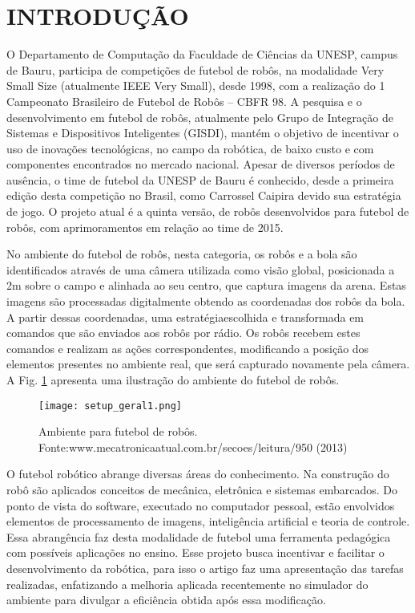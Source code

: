  \section{INTRODU{\c C}ÃO}

O Departamento de Computação da Faculdade de Ciências
da UNESP, campus de Bauru, participa de competições de
futebol de robôs, na modalidade Very Small Size (atualmente
IEEE Very Small), desde 1998, com a realização do 1\textordmasculine
Campeonato Brasileiro de Futebol de Robôs -- CBFR 98. A
pesquisa e o desenvolvimento em futebol de robôs, atualmente
pelo Grupo de Integração de Sistemas e Dispositivos
Inteligentes (GISDI), mantém o objetivo de incentivar o uso de
inovações tecnológicas, no campo da robótica, de baixo custo e
com componentes encontrados no mercado nacional. Apesar
de diversos períodos de ausência, o time de futebol da UNESP
de Bauru é conhecido, desde a primeira edição desta
competição no Brasil, como Carrossel Caipira devido sua
estratégia de jogo. O projeto atual é a quinta versão, de robôs
desenvolvidos para futebol de robôs, com aprimoramentos em
relação ao time de 2015.

No ambiente do futebol de robôs, nesta categoria, os robôs
e a bola são identificados através de uma câmera utilizada
como visão global, posicionada a 2m sobre o campo e alinhada
ao seu centro, que captura imagens da arena. Estas imagens são
processadas digitalmente obtendo as coordenadas dos robôs da bola.
A partir dessas coordenadas, uma estratégiaescolhida e transformada em comandos que são enviados aos
robôs por rádio. Os robôs recebem estes comandos e realizam
as ações correspondentes, modificando a posição dos
elementos presentes no ambiente real, que será capturado
novamente pela câmera. A Fig. \ref{fig:setup_geral} apresenta uma ilustração do
ambiente do futebol de robôs.

\begin{figure}[!htb]
\centering
\texttt{[image: setup\_geral1.png]}
\caption{Ambiente para futebol de robôs. Fonte:www.mecatronicaatual.com.br/secoes/leitura/950 (2013)}
\label{fig:setup_geral}
\end{figure}

O futebol robótico abrange diversas áreas do conhecimento.
Na construção do robô são aplicados conceitos de mecânica,
eletrônica e sistemas embarcados. Do ponto de vista do
software, executado no computador pessoal, estão envolvidos
elementos de processamento de imagens, inteligência artificial
e teoria de controle. Essa abrangência faz desta modalidade de
futebol uma ferramenta pedagógica com possíveis aplicações
no ensino.
Esse projeto busca incentivar e facilitar o desenvolvimento
da robótica, para isso o artigo faz uma apresentação das tarefas
realizadas, enfatizando a melhoria aplicada recentemente no
simulador do ambiente para divulgar a eficiência obtida após
essa modificação.
